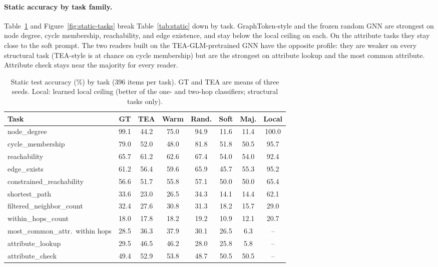 \documentclass[11pt]{article}
\begin{document}
\paragraph{Static accuracy by task family.}
Table~\ref{tab:static-tasks} and Figure~\ref{fig:static-tasks} break Table~\ref{tab:static} down by task.
GraphToken-style and the frozen random GNN are strongest on node degree, cycle membership, reachability, and edge existence, and stay below the local ceiling on each.
On the attribute tasks they stay close to the soft prompt.
The two readers built on the TEA-GLM-pretrained GNN have the opposite profile: they are weaker on every structural task (TEA-style is at chance on cycle membership) but are the strongest on attribute lookup and the most common attribute.
Attribute check stays near the majority for every reader.

\begin{table}[t]
\centering
\small
\begin{tabular}{@{}lccccccc@{}}
\toprule
\textbf{Task} & \textbf{GT} & \textbf{TEA} & \textbf{Warm} & \textbf{Rand.} & \textbf{Soft} & \textbf{Maj.} & \textbf{Local} \\
\midrule
node\_degree & 99.1 & 44.2 & 75.0 & 94.9 & 11.6 & 11.4 & 100.0 \\
cycle\_membership & 79.0 & 52.0 & 48.0 & 81.8 & 51.8 & 50.5 & 95.7 \\
reachability & 65.7 & 61.2 & 62.6 & 67.4 & 54.0 & 54.0 & 92.4 \\
edge\_exists & 61.2 & 56.4 & 59.6 & 65.9 & 45.7 & 55.3 & 95.2 \\
constrained\_reachability & 56.6 & 51.7 & 55.8 & 57.1 & 50.0 & 50.0 & 65.4 \\
shortest\_path & 33.6 & 23.0 & 26.5 & 34.3 & 14.1 & 14.4 & 62.1 \\
filtered\_neighbor\_count & 32.4 & 27.6 & 30.8 & 31.3 & 18.2 & 15.7 & 29.0 \\
within\_hops\_count & 18.0 & 17.8 & 18.2 & 19.2 & 10.9 & 12.1 & 20.7 \\
most\_common\_attr.\ within hops & 28.5 & 36.3 & 37.9 & 30.1 & 26.5 & 6.3 & -- \\
attribute\_lookup & 29.5 & 46.5 & 46.2 & 28.0 & 25.8 & 5.8 & -- \\
attribute\_check & 49.4 & 52.9 & 53.8 & 48.7 & 50.5 & 50.5 & -- \\
\bottomrule
\end{tabular}
\caption{Static test accuracy (\%) by task (396 items per task). GT and TEA are means of three seeds. Local: learned local ceiling (better of the one- and two-hop classifiers; structural tasks only).}
\label{tab:static-tasks}
\end{table}
\end{document}
